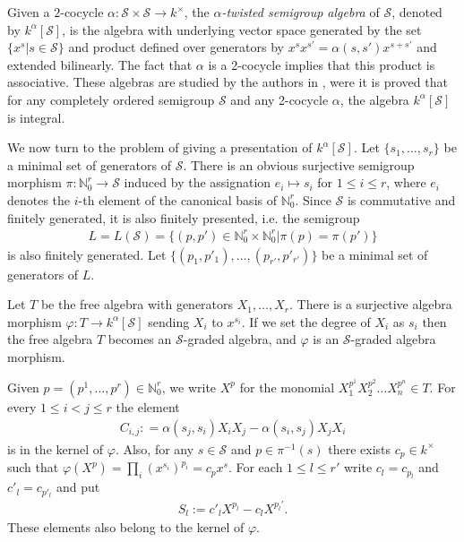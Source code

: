 \documentclass[11pt,fleqn]{article}
\theoremstyle{plain}
\theoremstyle{remark}
\theoremstyle{definition}
\newcommand\NN{\mathbb N}
\renewcommand\to{\longrightarrow}
\renewcommand\phi{\varphi}
\renewcommand\S{\mathcal S}
\begin{document}
Given a $2$-cocycle $\alpha: \S \times \S \to k^\times$, the \emph{$\alpha$-twisted
semigroup algebra} of $\S$, denoted by $k^\alpha[\S]$, is the algebra with underlying
vector space generated by the set $\{x^s|s \in \S\}$ and product defined over
generators by $x^s x^{s'} = \alpha(s,s') x^{s+s'}$ and extended bilinearly. The fact that
$\alpha$ is a 2-cocycle implies that this product is associative. These algebras are
studied by the authors in \cite{RZ2}, were it is proved that for any completely ordered
semigroup $\S$ and any 2-cocycle $\alpha$, the algebra $k^\alpha[\S]$ is integral.

We now turn to the problem of giving a presentation of $k^\alpha[\S]$.
Let $\{s_1, \ldots, s_r\}$ be a minimal set of generators of $\S$. There is an obvious
surjective semigroup morphism $\pi: \NN_0^r \rightarrow \S$ induced by the assignation $e_i
\mapsto s_i$ for $1 \leq i \leq r$, where $e_i$ denotes the $i$-th element of the
canonical basis of $\NN_0^r$. Since $\S$ is commutative and finitely generated, it is also
finitely presented, i.e. the semigroup 
\begin{align*}
  L = L(\S) = \{(p,p') \in \NN_0^r \times \NN_0^r| \pi(p) = \pi(p')\}
\end{align*}
is also finitely generated. Let $\{(p_1,p'_1), \ldots, (p_{r'},p'_{r'})\}$ be a minimal
set of generators of $L$.

Let $T$ be the free algebra with generators $X_1, \ldots, X_r$. There is a surjective
algebra morphism $\phi: T \to k^\alpha[\S]$ sending $X_i$ to $x^{s_i}$. If we set the
degree of $X_i$ as $s_i$ then the free algebra $T$ becomes an $\S$-graded algebra, and
$\phi$ is an $\S$-graded algebra morphism.

Given $p = (p^1, \ldots, p^r) \in \NN_0^r$, we write $X^p$ for the monomial $X_1^{p^1}
X_2^{p^2} \ldots X_n^{p^n} \in T$. For every $1 \leq i<j\leq r$ the element
\begin{align*}
C_{i,j}: =\alpha(s_j,s_i) X_i X_j - \alpha(s_i,s_j)X_j X_i
\end{align*}
is in the kernel of $\phi$. Also, for any $s \in \S$ and $p \in \pi^{-1}(s)$ there exists 
$c_p \in k^\times$ such that $\phi(X^p) = \prod_i (x^{s_i})^{p_i} = c_p x^s$. For each $1
\leq l \leq r'$ write $c_l = c_{p_l}$ and $c'_l = c_{p'_l}$ and put
\begin{align*}
S_l:= c'_l X^{p_l} - c_l X^{p_l'}.
\end{align*}
These elements also belong to the kernel of $\phi$. 
\end{document}
